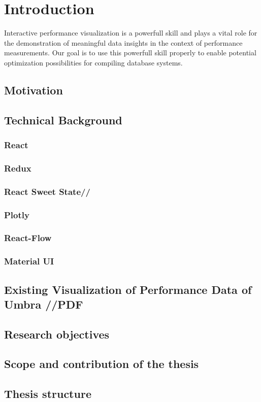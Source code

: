 
\chapter{Introduction}\label{chapter:introduction}
Interactive performance visualization is a powerfull skill and plays a vital role for the demonstration of meaningful data insights in the context of performance measurements. Our goal is to use this powerfull skill properly to enable potential optimization possibilities for compiling database systems.

\section{Motivation}
\section{Technical Background}
\subsection{React}
\subsection{Redux}
\subsection{React Sweet State//}
\subsection{Plotly}
\subsection{React-Flow}
\subsection{Material UI}
\section{Existing Visualization of Performance Data of Umbra //PDF }
\section{Research objectives}
\section{Scope and contribution of the thesis}
\section{Thesis structure}

